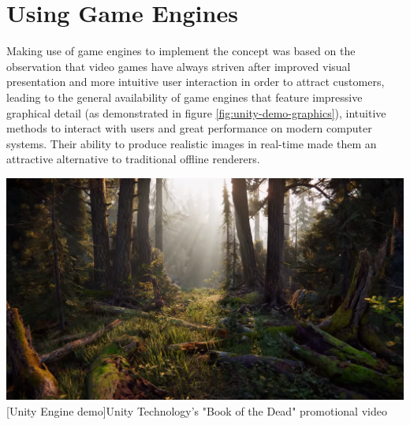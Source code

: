 \section{Using Game Engines}
Making use of game engines to implement the concept was based on the observation that video games have always striven after improved visual presentation and more intuitive user interaction in order to attract customers, leading to the general availability of game engines that feature impressive graphical detail (as demonstrated in figure \ref{fig:unity-demo-graphics}), intuitive methods to interact with users and great performance on modern computer systems. Their ability to produce realistic images in real-time made them an attractive alternative to traditional offline renderers.
\begin{center}
\noindent\includegraphics[width=14cm]{tex/img/ch05/UnityGraphicsDemo.png}
[Unity Engine demo]{Unity Technology's "Book of the Dead" promotional video \cite{UnityDemoRealtimeTeaser}}
\label{fig:unity-demo-graphics}
\end{center}

